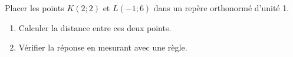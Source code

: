 
\begin{exercice}\label{exoSeconde-0008}

    Placer les points \( K(2;2)\) et \( L(-1;6)\) dans un repère orthonormé d'unité \unit{1}{\centi\meter}. 
    \begin{enumerate}
        \item
            Calculer la distance entre ces deux points.
        \item
            Vérifier la réponse en mesurant avec une règle.
    \end{enumerate}

\end{exercice}
